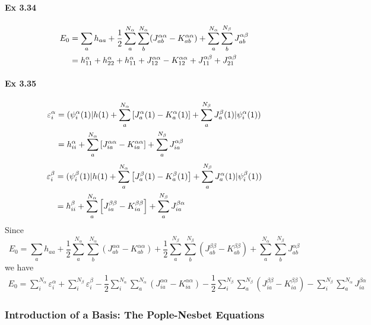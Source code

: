 \documentclass[a4paper]{article}
\newcommand{\ex}[1]{\paragraph{Ex #1}}
\numberwithin{equation}{subsection}
\begin{document}
\ex{3.34}
\begin{align}
E_0 &= \sum_a h_{aa} + \dfrac{1}{2}\sum_a^{N_\alpha}\sum_b^{N_\alpha} (J_{ab}^{\alpha\alpha} - K_{ab}^{\alpha\alpha}) 
+ \sum_a^{N_\alpha}\sum_b^{N_\beta} J_{ab}^{\alpha\beta} \notag\\
&= h_{11}^\alpha + h_{22}^\alpha + h_{11}^\alpha + J_{12}^{\alpha\alpha} - K_{12}^{\alpha\alpha} + J_{11}^{\alpha\beta} + J_{21}^{\alpha\beta}
\end{align}

\ex{3.35}
\begin{align}
\varepsilon_i^\alpha &= (\psi_i^\alpha(1) | h(1) + \sum_a^{N_\alpha}\qty[J_a^\alpha(1) - K_a^{\alpha}(1) ] + \sum_a^{N_\beta} J_a^\beta(1) | \psi_i^\alpha(1)) \notag\\
&= h_{ii}^\alpha + \sum_a^{N_\alpha}\qty[J_{ia}^{\alpha\alpha} - K_{ia}^{\alpha\alpha}] + \sum_a^{N_\beta} J_{ia}^{\alpha\beta}
\end{align}
\begin{align}
\varepsilon_i^\beta &= (\psi_i^\beta(1) | h(1) + \sum_a^{N_\alpha}\qty[J_a^\beta(1) - K_a^{\beta}(1) ] + \sum_a^{N_\beta} J_a^\alpha(1) | \psi_i^\beta(1)) \notag\\
&= h_{ii}^\beta + \sum_a^{N_\alpha}\qty[J_{ia}^{\beta\beta} - K_{ia}^{\beta\beta}] + \sum_a^{N_\beta} J_{ia}^{\beta\alpha}
\end{align}
Since
\begin{equation}\label{key}
E_0 = \sum_a h_{aa} + \dfrac{1}{2}\sum_a^{N_\alpha}\sum_b^{N_\alpha} (J_{ab}^{\alpha\alpha} - K_{ab}^{\alpha\alpha}) + \dfrac{1}{2}\sum_a^{N_\beta}\sum_b^{N_\beta} (J_{ab}^{\beta\beta} - K_{ab}^{\beta\beta}) 
+ \sum_a^{N_\alpha}\sum_b^{N_\beta} J_{ab}^{\alpha\beta}
\end{equation}
we have
\begin{align}
E_0 = \sum_i^{N_\alpha} \varepsilon_i^\alpha 
+ \sum_i^{N_\beta} \varepsilon_i^\beta 
- \dfrac{1}{2}\sum_i^{N_\alpha}\sum_a^{N_\alpha} (J_{ia}^{\alpha\alpha} - K_{ia}^{\alpha\alpha}) 
- \dfrac{1}{2}\sum_i^{N_\beta}\sum_a^{N_\beta} (J_{ia}^{\beta\beta} - K_{ia}^{\beta\beta}) 
- \sum_i^{N_\beta}\sum_a^{N_\alpha} J_{ia}^{\beta\alpha}
\end{align}

\subsubsection{Introduction of a Basis: The Pople-Nesbet Equations}
\end{document}
